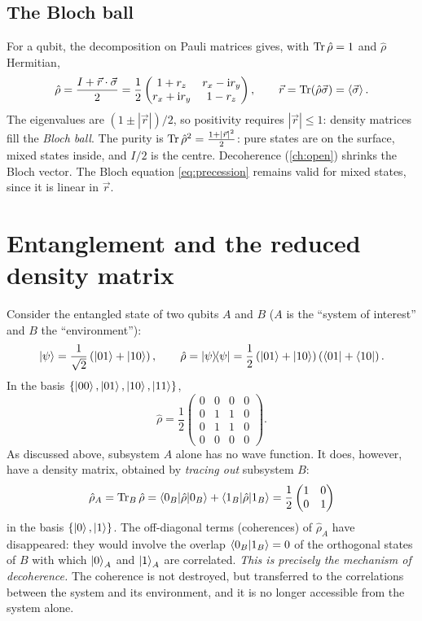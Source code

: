 \subsection{The Bloch ball}
For a qubit, the decomposition on Pauli matrices gives, with $\operatorname{Tr}\hat\rho=1$ and $\hat\rho$ Hermitian,
\begin{equation}\label{eq:blochball}
  \hat\rho=\frac{I+\vec r\cdot\vec\sigma}2=\frac12\begin{pmatrix}1+r_z&r_x-\mathrm i r_y\\ r_x+\mathrm i r_y&1-r_z\end{pmatrix},\qquad\vec r=\operatorname{Tr}(\hat\rho\vec\sigma)=\left\langle\vec\sigma\right\rangle.
\end{equation}
The eigenvalues are $(1\pm|\vec r|)/2$, so positivity requires $|\vec r|\le1$: density matrices fill the \emph{Bloch ball}. The purity is
$\operatorname{Tr}\hat\rho^2=\frac{1+|\vec r|^2}2$: pure states are on the surface, mixed states inside, and $I/2$ is the centre. Decoherence (\cref{ch:open}) shrinks the Bloch vector.
The Bloch equation \cref{eq:precession} remains valid for mixed states, since it is linear in $\vec r$.

\section{Entanglement and the reduced density matrix}\label{sec:reduced}
Consider the entangled state of two qubits $A$ and $B$ ($A$ is the ``system of interest'' and $B$ the ``environment''):
\begin{equation}
  \left|\psi\right\rangle=\frac1{\sqrt2}\left(\left|01\right\rangle+\left|10\right\rangle\right),\qquad\hat\rho=\left|\psi\middle\rangle\!\middle\langle\psi\right|=\frac12\left(\left|01\right\rangle+\left|10\right\rangle\right)\left(\left\langle01\right|+\left\langle10\right|\right).
\end{equation}
In the basis $\{\left|00\right\rangle,\left|01\right\rangle,\left|10\right\rangle,\left|11\right\rangle\}$,
\begin{equation}
  \hat\rho=\frac12\begin{pmatrix}0&0&0&0\\0&1&1&0\\0&1&1&0\\0&0&0&0\end{pmatrix}.
\end{equation}
As discussed above, subsystem $A$ alone has no wave function. It does, however, have a density matrix, obtained by \emph{tracing out} subsystem $B$:
\begin{equation}
  \hat\rho_A=\operatorname{Tr}_B\hat\rho=\left\langle0_B\middle|\hat\rho\middle|0_B\right\rangle+\left\langle1_B\middle|\hat\rho\middle|1_B\right\rangle=\frac12\begin{pmatrix}1&0\\0&1\end{pmatrix}
\end{equation}
in the basis $\{\left|0\right\rangle,\left|1\right\rangle\}$. The off-diagonal terms (coherences) of $\hat\rho_A$ have disappeared: they would involve the overlap $\left\langle0_B\middle|1_B\right\rangle=0$ of the orthogonal states of $B$
with which $\left|0\right\rangle_A$ and $\left|1\right\rangle_A$ are correlated. \emph{This is precisely the mechanism of decoherence.} The coherence is not destroyed, but transferred to the correlations between
the system and its environment, and it is no longer accessible from the system alone.

